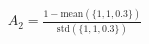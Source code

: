\documentclass[preview]{standalone}
\begin{document}
\begin{align*}
A_2 = \frac{1 - \text{mean}\left(\{1, 1, 0.3\}\right)}{\text{std}\left(\{1, 1, 0.3\}\right)}
\end{align*}
\end{document}

